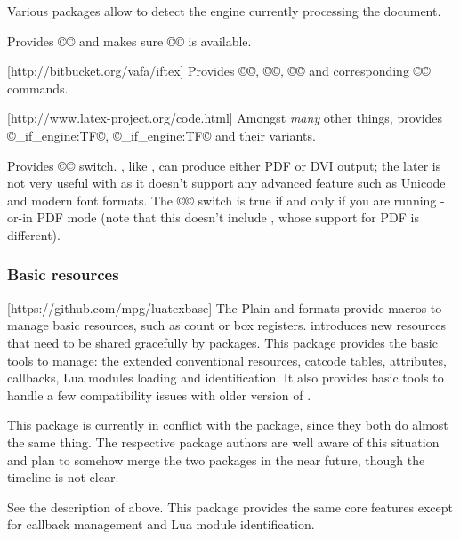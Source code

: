 \documentclass{lltxdoc}
\begin{document}
Various packages allow to detect the engine currently processing the document.

Provides ©\ifluatex© and makes sure ©\luatexversion© is available.

[http://bitbucket.org/vafa/iftex]
Provides ©\ifPDFTeX©, ©\ifXeTeX©, ©\ifLuaTeX© and corresponding ©\Require©
commands.

[http://www.latex-project.org/code.html]
Amongst \emph{many} other things, provides ©\luatex_if_engine:TF©,
©\xetex_if_engine:TF© and their variants.

Provides ©\ifpdf© switch. \luatex, like \pdftex, can produce either PDF or DVI
output; the later is not very useful with \luatex as it doesn't support any
advanced feature such as Unicode and modern font formats. The ©\ifpdf© switch
is true if and only if you are running \pdftex-or-\luatex in PDF mode (note
that this doesn't include \xetex, whose support for PDF is different).

\subsubsection{Basic resources}

[https://github.com/mpg/luatexbase]
The Plain and \latex formats provide macros to manage \tex basic resources,
such as count or box registers. \luatex introduces new resources that need to
be shared gracefully by packages. This package provides the basic tools to
manage: the extended conventional \tex resources, catcode tables, attributes,
callbacks, Lua modules loading and identification. It also provides basic
tools to handle a few compatibility issues with older version of \luatex.

 This package is currently in conflict with the 
package, since they both do almost the same thing. The respective package
authors are well aware of this situation and plan to somehow merge the two
packages in the near future, though the timeline is not clear.

See the description of  above. This package provides the same
core features except for callback management and Lua module identification.
\end{document}
